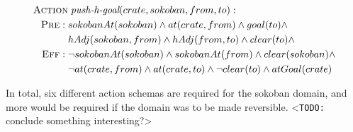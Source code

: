 \documentclass[../Master.tex]{subfiles}
\begin{document}
\begin{align}
\begin{split} \label{act:pushhgoal}
\textsc{Action} &\; \textit{push-h-goal}(crate, sokoban, from, to): \\
\textsc{Pre}: \; & sokobanAt(sokoban) \land
at(crate, from) \land
goal(to) \land \\
& hAdj(sokoban, from) \land
hAdj(from, to) \land
clear(to) \land
\\
\textsc{Eff}: \; & \neg sokobanAt(sokoban) \land
sokobanAt(from) \land
clear(sokoban) \land \\
& \neg at(crate, from) \land
at(crate, to) \land
\neg clear(to) \land
atGoal(crate)
\end{split}
\end{align}

In total, six different action schemas are required for the sokoban domain, and more would be required if the domain was to be made reversible. <\texttt{TODO:} conclude something interesting?>
\end{document}
